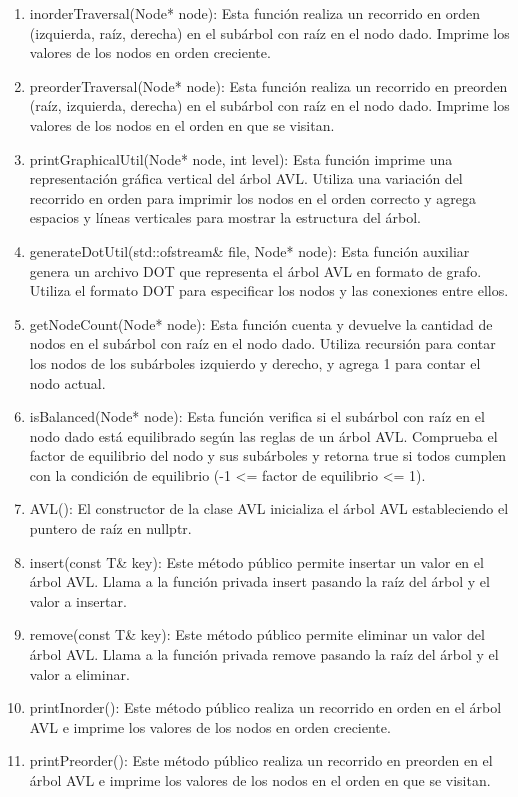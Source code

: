 \documentclass[]{article}
\begin{document}
\begin{enumerate}
    \item inorderTraversal(Node* node): Esta función realiza un recorrido en orden (izquierda, raíz, derecha) en el subárbol con raíz en el nodo dado. Imprime los valores de los nodos en orden creciente.
    \item preorderTraversal(Node* node): Esta función realiza un recorrido en preorden (raíz, izquierda, derecha) en el subárbol con raíz en el nodo dado. Imprime los valores de los nodos en el orden en que se visitan.
    \item printGraphicalUtil(Node* node, int level): Esta función imprime una representación gráfica vertical del árbol AVL. Utiliza una variación del recorrido en orden para imprimir los nodos en el orden correcto y agrega espacios y líneas verticales para mostrar la estructura del árbol.
    \item generateDotUtil(std::ofstream\& file, Node* node): Esta función auxiliar genera un archivo DOT que representa el árbol AVL en formato de grafo. Utiliza el formato DOT para especificar los nodos y las conexiones entre ellos.
    \item getNodeCount(Node* node): Esta función cuenta y devuelve la cantidad de nodos en el subárbol con raíz en el nodo dado. Utiliza recursión para contar los nodos de los subárboles izquierdo y derecho, y agrega 1 para contar el nodo actual.
    \item isBalanced(Node* node): Esta función verifica si el subárbol con raíz en el nodo dado está equilibrado según las reglas de un árbol AVL. Comprueba el factor de equilibrio del nodo y sus subárboles y retorna true si todos cumplen con la condición de equilibrio (-1 <= factor de equilibrio <= 1).
    \item AVL(): El constructor de la clase AVL inicializa el árbol AVL estableciendo el puntero de raíz en nullptr.
    \item insert(const T\& key): Este método público permite insertar un valor en el árbol AVL. Llama a la función privada insert pasando la raíz del árbol y el valor a insertar.
    \item remove(const T\& key): Este método público permite eliminar un valor del árbol AVL. Llama a la función privada remove pasando la raíz del árbol y el valor a eliminar.
    \item printInorder(): Este método público realiza un recorrido en orden en el árbol AVL e imprime los valores de los nodos en orden creciente.
    \item printPreorder(): Este método público realiza un recorrido en preorden en el árbol AVL e imprime los valores de los nodos en el orden en que se visitan.

\end{enumerate}
\end{document}
